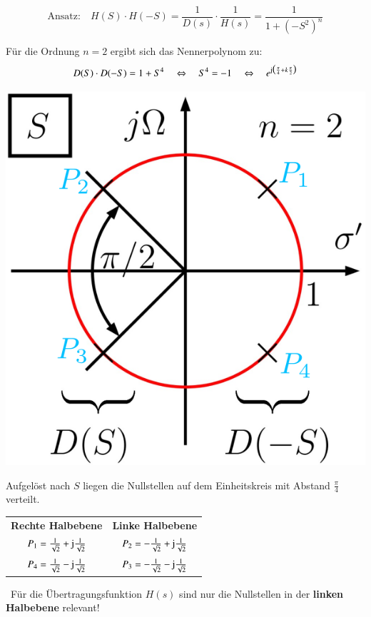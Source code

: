 
$$ \text{Ansatz:} \quad H(S) \cdot H(-S) = \frac{1}{D(s)} \cdot \frac{1}{H(s)} = \frac{1}{ 1 + (-S^2)^n} $$

Für die Ordnung $n = 2$ ergibt sich das Nennerpolynom zu:
$$ D(S) \cdot D(-S) = 1 + S^4 \quad \Leftrightarrow \quad S^4 = -1 \quad \Leftrightarrow \quad
    e^{\mathrm{j} \bigl( \frac{\pi}{4} + k \frac{\pi}{2} \bigr)}$$

\begin{minipage}[c]{0.3\columnwidth}
    \includegraphics[width=\columnwidth]{images/filter_butterworth_pollagen_ordnung_2.png}
\end{minipage}
\hfill
\begin{minipage}[c]{0.58\columnwidth}
    Aufgelöst nach $S$ liegen die Nullstellen auf dem Einheitskreis mit Abstand $\frac{\pi}{4}$ verteilt.
    \vspace{0.2cm}

    \renewcommand{\arraystretch}{1.3}
    \begin{tabular}{c c}
        \textbf{Rechte Halbebene}                             & \textbf{Linke Halbebene} \\
        $P_1 = \frac{1}{\sqrt{2}} + \mathrm{j} \frac{1}{\sqrt{2}}$ & $P_2 = - \frac{1}{\sqrt{2}} + \mathrm{j} \frac{1}{\sqrt{2}}$ \\
        $P_4 = \frac{1}{\sqrt{2}} - \mathrm{j} \frac{1}{\sqrt{2}}$ & $P_3 = - \frac{1}{\sqrt{2}} - \mathrm{j} \frac{1}{\sqrt{2}}$ \\
    \end{tabular}
    \renewcommand{\arraystretch}{1}

    \vspace{0.2cm}
    \textrightarrow\ Für die Übertragungsfunktion $H(s)$ sind nur die Nullstellen in der \textbf{linken Halbebene} relevant!
\end{minipage}


